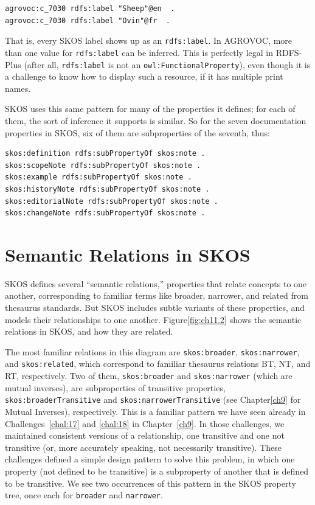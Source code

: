 \begin{lstlisting}
agrovoc:c_7030 rdfs:label "Sheep"@en  .
agrovoc:c_7030 rdfs:label "Ovin"@fr  .
\end{lstlisting}

That is, every SKOS label shows up as an \texttt{rdfs:label}. In AGROVOC, more
than one value for \texttt{rdfs:label} can be inferred. This is perfectly legal
in RDFS-Plus (after all, \texttt{rdfs:label} is not an \texttt{owl:FunctionalProperty}),
even though it is a challenge to know how to display such a resource, if
it has multiple print names.

SKOS uses this same pattern for many of the properties it defines; for
each of them, the sort of inference it supports is similar. So for the
seven documentation properties in SKOS, six of them are subproperties of
the seventh, thus:

\begin{lstlisting}
skos:definition rdfs:subPropertyOf skos:note .
skos:scopeNote rdfs:subPropertyOf skos:note .
skos:example rdfs:subPropertyOf skos:note .
skos:historyNote rdfs:subPropertyOf skos:note .
skos:editorialNote rdfs:subPropertyOf skos:note .
skos:changeNote rdfs:subPropertyOf skos:note .
\end{lstlisting}

\section{Semantic Relations in SKOS}

SKOS defines several ``semantic relations,'' properties that relate
concepts to one another, corresponding to familiar terms like broader,
narrower, and related from thesaurus standards. But SKOS includes subtle
variants of these properties, and models their relationships to one
another. Figure\ref{fig:ch11.2} shows the semantic relations in SKOS, and how they
are related.

The most familiar relations in this diagram are \texttt{skos:broader},
\texttt{skos:narrower}, and
\texttt{skos:related}, which correspond to familiar thesaurus relations BT, NT,
and RT, respectively. Two of them, \texttt{skos:broader} and \texttt{skos:narrower} (which
are mutual inverses), are subproperties of transitive properties,
\texttt{skos:broaderTransitive} and \texttt{skos:narrowerTransitive} (see Chapter\ref{ch9} for
Mutual Inverses), respectively. This is a familiar pattern we have seen
already in Challenges~\ref{chal:17} and \ref{chal:18} in Chapter~\ref{ch9}. In those challenges, we
maintained consistent versions of a relationship, one transitive and one
not transitive (or, more accurately speaking, not necessarily
transitive). These challenges defined a simple design pattern to solve
this problem, in which one property (not defined to be transitive) is a
subproperty of another that is defined to be transitive. We see two
occurrences of this pattern in the SKOS property tree, once each for
\texttt{broader} and \texttt{narrower}.

